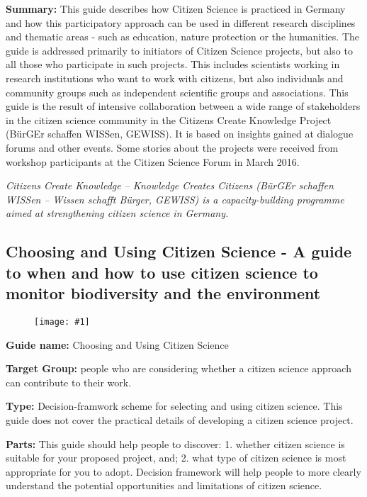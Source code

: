 \documentclass{article}
\newlength{\imgwidth}
\newcommand\scaledgraphics[2]{%
                
\settowidth{\imgwidth}{\texttt{[image: \#1]}}%
                
\setlength{\imgwidth}{\minof{\imgwidth}{#2\textwidth}}%
                
\texttt{[image: \#1]}%
                
}
\begin{document}
\textbf{Summary: }This guide describes how Citizen Science is practiced in Germany and how this participatory approach can be used in different research disciplines and thematic areas - such as education, nature protection or the humanities. The guide is addressed primarily to initiators of Citizen Science projects, but also to all those who participate in such projects. This includes scientists working in research institutions who want to work with citizens, but also individuals and community groups such as independent scientific groups and associations. This guide is the result of intensive collaboration between a wide range of stakeholders in the citizen science community in the Citizens Create Knowledge Project (BürGEr schaffen WISSen, GEWISS). It is based on insights gained at dialogue forums and other events. Some stories about the projects were received from workshop participants at the Citizen Science Forum in March 2016.


\emph{Citizens Create Knowledge – Knowledge Creates Citizens (BürGEr schaffen WISSen – Wissen schafft Bürger, GEWISS) is a capacity-building programme aimed at strengthening citizen science in Germany.}


\subsection{Choosing and Using Citizen Science - A guide to when and how to use citizen science to monitor biodiversity and the environment}\label{H1285339}


\begin{figure}
\scaledgraphics{dba5d5eb-235c-4694-a2d4-c26b6e16182b.png}{0.5}
\label{F60064251}
\end{figure}


\textbf{Guide name: }Choosing and Using Citizen Science \autocite{pocock_choosing_2014}


\textbf{Target Group: }people who are considering whether a citizen science approach can contribute to their work.


\textbf{Type: }Decision-framwork scheme for selecting and using citizen science. This guide does not cover the practical details of developing a citizen science project.


\textbf{Parts: }This guide should help people to discover:  1. whether citizen science is suitable for your proposed project, and;  2. what type of citizen science is most appropriate for you to adopt. Decision framework will help people to more clearly understand the potential opportunities and limitations of citizen science.
\end{document}
